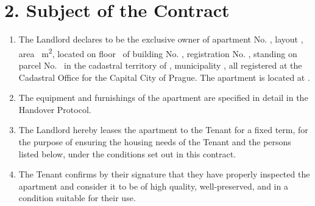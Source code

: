 \section*{2. Subject of the Contract}

\begin{enumerate}[label=\arabic*.]
    \item The Landlord declares to be the exclusive owner of apartment No. \Propunitnumber, layout \Propdisposition, area \Propaream~m\textsuperscript{2}, located on floor \Propfloor\ of building No. \Propbuildingnumber, registration No. \Propbuildingregistration, standing on parcel No. \Propparcelnumber\ in the cadastral territory of \Propcadastralterritory, municipality \Propmunicipality, all registered at the Cadastral Office for the Capital City of Prague. The apartment is located at \Propaddress.
    \item The equipment and furnishings of the apartment are specified in detail in the Handover Protocol.
    \item The Landlord hereby leases the apartment to the Tenant for a fixed term, for the purpose of ensuring the housing needs of the Tenant and the persons listed below, under the conditions set out in this contract.
    \item The Tenant confirms by their signature that they have properly inspected the apartment and consider it to be of high quality, well-preserved, and in a condition suitable for their use.
\end{enumerate}
